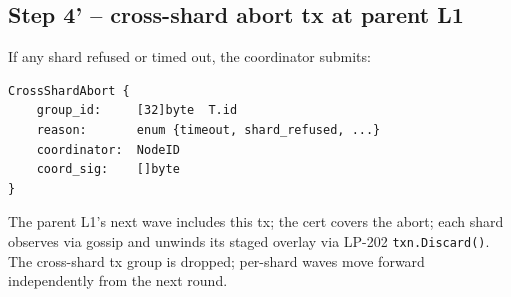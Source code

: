 \subsection{Step 4' -- cross-shard abort tx at parent L1}

If any shard refused or timed out, the coordinator submits:

\begin{verbatim}
CrossShardAbort {
    group_id:     [32]byte  T.id
    reason:       enum {timeout, shard_refused, ...}
    coordinator:  NodeID
    coord_sig:    []byte
}
\end{verbatim}

The parent L1's next wave includes this tx; the cert covers the
abort; each shard observes via gossip and unwinds its staged
overlay via LP-202 \texttt{txn.Discard()}. The cross-shard tx
group is dropped; per-shard waves move forward independently from
the next round.
